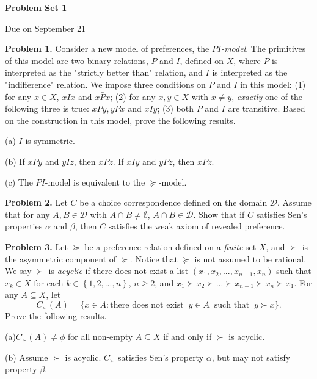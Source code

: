 \documentclass[12pt,english]{article}
\date{}
\begin{document}
	
\begin{center}
\begin{large}
\textbf{Problem Set 1}
\end{large}
\bigskip

Due on September 21
\end{center}

\noindent\textbf{Problem 1.} 
Consider a new model of preferences, the \emph{$PI$-model}. The primitives of this model are two binary relations, $P$ and $I$, defined on $X$, where $P$ is interpreted as the "strictly better than" relation, and $I$ is interpreted as the "indifference" relation. We impose three conditions on $P$ and $I$ in this model: 
(1) for any $x\in X$, $xIx$  and $x\bar{P}x$; (2) for any $x,y\in X$ with $x\neq y$, \emph{exactly} one of the following three is true: $xPy,yPx$ and $xIy$; (3) both $P$ and $I$ are transitive. Based on the construction in this model, prove the following results. 

\noindent(a) $I$ is symmetric.  

\noindent(b) If $xPy$ and $yIz$, then $xPz$. If $xIy$ and $yPz$, then $xPz$.

\noindent (c) The $PI$-model is equivalent to the $\succeq$-model.  

\bigskip

\noindent\textbf{Problem 2.} Let $C$ be a choice correspondence
defined on the domain $\mathcal{D}$. Assume that for any $A,B\in \mathcal{D}$ with $A\cap B\neq \emptyset$, $A\cap B\in \mathcal{D}$. Show that if $C$
satisfies Sen's properties $\alpha$ and $\beta$, then 
$C$ satisfies the weak axiom of revealed preference. 


\bigskip

\noindent\textbf{Problem 3.} 
Let $\succeq$ be a preference relation defined on a \emph{finite} set $X$, and $\succ$ is the asymmetric 
component of $\succeq$. Notice that $\succeq$ is not assumed to be rational. We say $\succ$ is \emph{acyclic} if there does not exist a list $(x_{1},x_{2},...,x_{n-1},x_{n})$ such that $x_{k}\in X$ for each $k\in \left\{1,2,...,n\right\}$, $n\geq 2$, and 
$x_{1}\succ x_{2}\succ...\succ x_{n-1}\succ x_{n}\succ x_{1}$. 
For any $A\subseteq X$, let 
\[C_{\succ}(A)=\big\{x\in A: \text{there does not exist}\;\; y\in A \;\;\text{such that}\;\; y\succ x\big\}.\]
Prove the following results. 

\noindent (a)$C_{\succ}(A)\neq \phi$ for all non-empty  $A\subseteq X$ if and only if $\succ$ is acyclic. 

\noindent (b) Assume $\succ$ is acyclic. $C_{\succ}$ satisfies Sen's property $\alpha$, but may not satisfy property $\beta$. 
\end{document}
